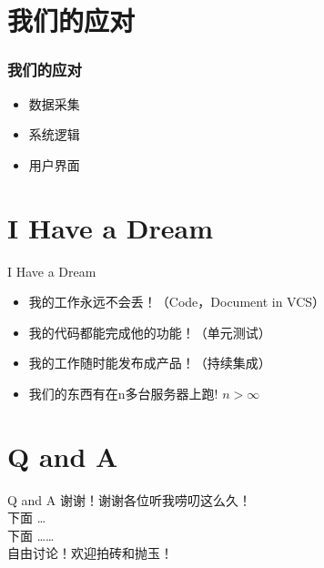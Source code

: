 \documentclass{beamer}
\begin{document}
\section{我们的应对}
\begin{frame}
    \frametitle{我们的应对}
    \pause
    \begin{itemize}
        \item 数据采集
        \item 系统逻辑
        \item 用户界面
    \end{itemize}
\end{frame}

\section{I Have a Dream} 
\begin{frame}{I Have a Dream}
    \pause
    \begin{itemize}
        \item 我的工作永远不会丢！（Code，Document in VCS）
        \item 我的代码都能完成他的功能！（单元测试）
        \item 我的工作随时能发布成产品！（持续集成）
        \item 我们的东西有在n多台服务器上跑! \( n > \infty \) 
    \end{itemize}
\end{frame}

\section{Q and A}
\begin{frame}{Q and A }
    谢谢！谢谢各位听我唠叨这么久！\\
    \pause
    下面 \ldots \pause \\
    下面 \ldots \ldots \pause \\
    自由讨论！欢迎拍砖和抛玉！
\end{frame}
\end{document}
